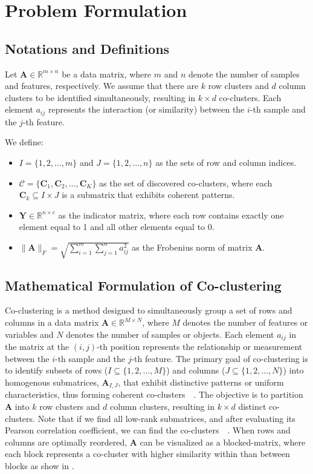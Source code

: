 \documentclass[journal]{IEEEtran}
\renewcommand{\cite}[1]{~\autocite{#1}}
\begin{document}
\section{Problem Formulation}
\label{sec:problem_formulation}

\subsection{Notations and Definitions}
Let $\mathbf{A} \in \mathbb{R}^{m \times n}$ be a data matrix, where $m$ and $n$ denote the number of samples and features, respectively. We assume that there are $k$ row clusters and $d$ column clusters to be identified simultaneously, resulting in $k \times d$ co-clusters. Each element $a_{ij}$ represents the interaction (or similarity) between the $i$-th sample and the $j$-th feature.

We define:
\begin{itemize}
    \item $I = \{1,2,\ldots,m\}$ and $J = \{1,2,\ldots,n\}$ as the sets of row and column indices.
    \item $\mathcal{C} = \{\mathbf{C}_1, \mathbf{C}_2, \ldots, \mathbf{C}_K\}$ as the set of discovered co-clusters, where each $\mathbf{C}_k \subseteq I \times J$ is a submatrix that exhibits coherent patterns.
    \item $\mathbf{Y} \in \mathbb{R}^{n \times c}$ as the indicator matrix, where each row contains exactly one element equal to 1 and all other elements equal to 0.
    \item $\|\mathbf{A}\|_F = \sqrt{\sum_{i=1}^m \sum_{j=1}^n a_{ij}^2}$ as the Frobenius norm of matrix $\mathbf{A}$.
\end{itemize}

\subsection{Mathematical Formulation of Co-clustering}
Co-clustering is a method designed to simultaneously group a set of rows and columns in a data matrix $\mathbf{A} \in \mathbb{R}^{M \times N}$, where $M$ denotes the number of features or variables and $N$ denotes the number of samples or objects. Each element $a_{ij}$ in the matrix at the $(i, j)$-th position represents the relationship or measurement between the $i$-th sample and the $j$-th feature. The primary goal of co-clustering is to identify subsets of rows ($I\subseteq \{1, 2, \ldots, M\}$) and columns ($J\subseteq \{1, 2, \ldots, N\}$) into homogenous submatrices, $\mathbf{A}_{I, J}$, that exhibit distinctive patterns or uniform characteristics, thus forming coherent co-clusters~\cite{zhao2017DetectionCorrelatedCoclusters}. The objective is to partition $\mathbf{A}$ into $k$ row clusters and $d$ column clusters, resulting in $k \times d$ distinct co-clusters. Note that if we find all low-rank submatrices, and after evaluating its Pearson correlation coefficient, we can find the co-clusters~\cite{zhao2016IdentifyingMultidimensionalCoclusters}. When rows and columns are optimally reordered, $\mathbf{A}$ can be visualized as a blocked-matrix, where each block represents a co-cluster with higher similarity within than between blocks as show in .
\end{document}
